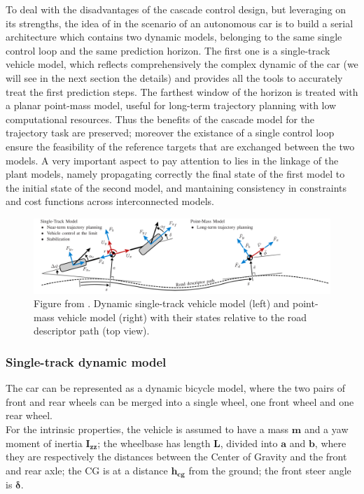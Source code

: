 \documentclass[a4paper, onecolumn, 11pt]{article}
\begin{document}
To deal with the disadvantages of the cascade control design, but leveraging on
its strengths, the idea of \cite{paper} in the scenario of an autonomous car is
to build a serial architecture which contains two dynamic models, belonging to
the same single control loop and the same prediction horizon. The first one is a
single-track vehicle model, which reflects comprehensively the complex dynamic
of the car (we will see in the next section the details) and provides all the
tools to accurately treat the first prediction steps. The farthest window of the
horizon is treated with a planar point-mass model, useful for long-term
trajectory planning with low computational resources. Thus the benefits of the
cascade model for the trajectory task are preserved; moreover the existance of a
single control loop ensure the feasibility of the reference targets that are
exchanged between the two models. A very important aspect to pay attention to
lies in the linkage of the plant models, namely propagating correctly the final
state of the first model to the initial state of the second model, and
mantaining consistency in constraints and cost functions across interconnected
models. 

\begin{figure}[H]
    \centering
    \includegraphics[width=\textwidth]{assets/models.png}
    \caption{Figure from \cite{paper}. Dynamic single-track vehicle model (left)
    and point-mass vehicle model (right) with their states relative to the road
    descriptor path (top view).}
\end{figure}

\subsubsection{Single-track dynamic model}
The car can be represented as a dynamic bicycle model, where the two pairs of
front and rear wheels can be merged into a single wheel, one front wheel and one
rear wheel.\\
For the intrinsic properties, the vehicle is assumed to have a mass $\mathbf{m}$
and a yaw moment of inertia $\mathbf{I_{zz}}$; the wheelbase has length
$\mathbf{L}$, divided into $\mathbf{a}$ and $\mathbf{b}$, where they are
respectively the distances between the Center of Gravity and the front and rear
axle; the CG is at a distance $\mathbf{h_{cg}}$ from the ground; the front steer
angle is $\mathbf{\delta}$.
\end{document}

